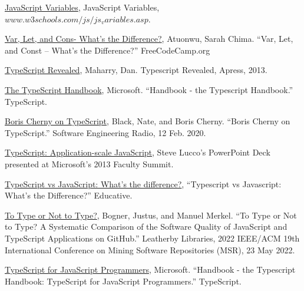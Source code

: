 \documentclass{article}
\theoremstyle{theorem}
\theoremstyle{definition}
\theoremstyle{remark}
\begin{document}
\begin{thebibliography}{99}
\href{https://www.w3schools.com/js/js_variables.asp}{JavaScript Variables}, JavaScript Variables, $www.w3schools.com/js/js_variables.asp$.

\href{https://www.freecodecamp.org/news/var-let-and-const-whats-the-difference/#:~:text=var%20declarations%20are%20globally%20scoped%20or%20function%20scoped%20while%20let,the%20top%20of%20their%20scope.}{Var, Let, and Cons- What's the Difference?}, Atuonwu, Sarah Chima. “Var, Let, and Const – What's the Difference?” FreeCodeCamp.org

\href{https://books.google.com/books?hl=en&lr=&id=UZB352QcfiMC&oi=fnd&pg=PP3&dq=development+of+TypeScript+&ots=sSSHwcWTni&sig=nEpU0OnsfhPkFJP5wwk_9NGA6Nk#v=onepage&q=development%20of%20TypeScript&f=false}{TypeScript Revealed}, Maharry, Dan. Typescript Revealed, Apress, 2013.

\href{https://www.typescriptlang.org/docs/handbook/intro.html}{The TypeScript Handbook}, Microsoft. “Handbook - the Typescript Handbook.” TypeScript.

\href{https://ieeexplore-ieee-org.libproxy.chapman.edu/stamp/stamp.jsp?tp=&arnumber=8994835}{Boris Cherny on TypeScript}, Black, Nate, and Boris Cherny. “Boris Cherny on TypeScript.” Software Engineering Radio, 12 Feb. 2020.

\href{https://www.microsoft.com/en-us/research/wp-content/uploads/2013/01/steve-lucco_modernprogramming.pdf}{TypeScript: Application-scale JavaScript}, Steve Lucco's PowerPoint Deck presented at Microsoft's 2013 Faculty Summit.

\href{https://www.educative.io/blog/typescript-vs-javascript-whats-the-difference}{TypeScript vs JavaScript: What's the difference?}, “Typescript vs Javascript: What's the Difference?” Educative.

\href{https://ieeexplore-ieee-org.libproxy.chapman.edu/stamp/stamp.jsp?tp=&arnumber=9796341}{To Type or Not to Type?}, Bogner, Justus, and Manuel Merkel. “To Type or Not to Type? A Systematic Comparison of the Software Quality of JavaScript and TypeScript Applications on GitHub.” Leatherby Libraries, 2022 IEEE/ACM 19th International Conference on Mining Software Repositories (MSR), 23 May 2022.

\href{https://www.typescriptlang.org/docs/handbook/typescript-in-5-minutes.html}{TypeScript for JavaScript Programmers}, Microsoft. “Handbook - the Typescript Handbook: TypeScript for JavaScript Programmers.” TypeScript.


\end{thebibliography}
\end{document}
